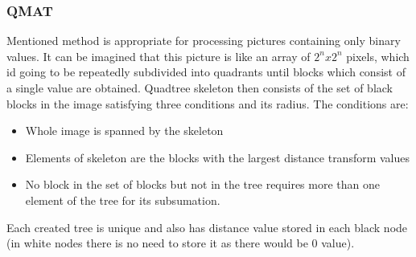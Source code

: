 \subsubsection{QMAT}
Mentioned method is appropriate for processing pictures containing only binary values. It can be imagined that this picture is like an array of $2^n x 2^n$ pixels, which id going to be repeatedly subdivided into quadrants until blocks which consist of a single value are obtained.
Quadtree skeleton then consists of the set of black blocks in the image satisfying three conditions and its radius. The conditions are:
\begin{itemize}
\item Whole image is spanned by the skeleton
\item Elements of skeleton are the blocks with the largest distance transform values
\item No block in the set of blocks but not in the tree requires more than one element of the tree for its subsumation.
\end{itemize}
Each created tree is unique and also has distance value stored in each black node (in white nodes there is no need to store it as there would be 0 value).

